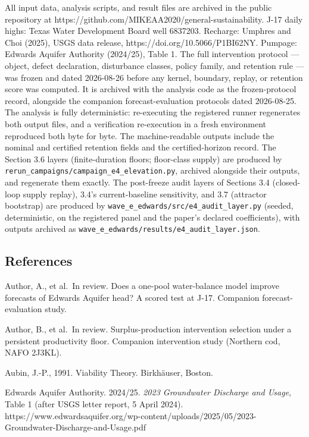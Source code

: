 \documentclass[11pt]{article}
\begin{document}
All input data, analysis scripts, and result files are archived in the
public repository at
https://github.com/MIKEAA2020/general-sustainability. J-17 daily highs:
Texas Water Development Board well 6837203. Recharge: Umphres and Choi
(2025), USGS data release, https://doi.org/10.5066/P1BI62NY. Pumpage:
Edwards Aquifer Authority (2024/25), Table 1. The full intervention
protocol --- object, defect declaration, disturbance classes, policy
family, and retention rule --- was frozen and dated 2026-08-26 before
any kernel, boundary, replay, or retention score was computed. It is
archived with the analysis code as the frozen-protocol record, alongside
the companion forecast-evaluation protocols dated 2026-08-25. The
analysis is fully deterministic: re-executing the registered runner
regenerates both output files, and a verification re-execution in a
fresh environment reproduced both byte for byte. The machine-readable
outputs include the nominal and certified retention fields and the
certified-horizon record. The Section 3.6 layers (finite-duration
floors; floor-class supply) are produced by
\texttt{rerun\_campaigns/campaign\_e4\_elevation.py}, archived alongside
their outputs, and regenerate them exactly. The post-freeze audit layers
of Sections 3.4 (closed-loop supply replay), 3.4's current-baseline
sensitivity, and 3.7 (attractor bootstrap) are produced by
\texttt{wave\_e\_edwards/src/e4\_audit\_layer.py} (seeded,
deterministic, on the registered panel and the paper's declared
coefficients), with outputs archived as
\texttt{wave\_e\_edwards/results/e4\_audit\_layer.json}.

\subsection{References}\label{references}

Author, A., et al.~In review. Does a one-pool water-balance model
improve forecasts of Edwards Aquifer head? A scored test at J-17.
Companion forecast-evaluation study.

Author, B., et al.~In review. Surplus-production intervention selection
under a persistent productivity floor. Companion intervention study
(Northern cod, NAFO 2J3KL).

Aubin, J.-P., 1991. Viability Theory. Birkh\"auser, Boston.

Edwards Aquifer Authority. 2024/25. \emph{2023 Groundwater Discharge and
Usage}, Table 1 (after USGS letter report, 5 April 2024).
https://www.edwardsaquifer.org/wp-content/uploads/2025/05/2023-Groundwater-Discharge-and-Usage.pdf
\end{document}
